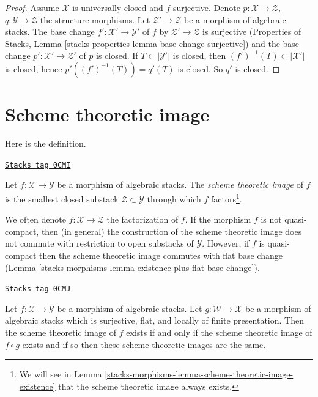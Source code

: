 \begin{proof}
Assume $\mathcal{X}$ is universally closed and $f$ surjective.
Denote $p : \mathcal{X} \to \mathcal{Z}$,
$q : \mathcal{Y} \to \mathcal{Z}$ the structure morphisms.
Let $\mathcal{Z}' \to \mathcal{Z}$ be a morphism of algebraic stacks.
The base change $f' : \mathcal{X}' \to \mathcal{Y}'$
of $f$ by $\mathcal{Z}' \to \mathcal{Z}$ is surjective
(Properties of Stacks, Lemma
\ref{stacks-properties-lemma-base-change-surjective}) and the base
change $p' : \mathcal{X}' \to \mathcal{Z}'$ of $p$ is closed.
If $T \subset |\mathcal{Y}'|$ is closed, then
$(f')^{-1}(T) \subset |\mathcal{X}'|$ is closed, hence
$p'((f')^{-1}(T)) = q'(T)$ is closed. So $q'$ is closed.
\end{proof}

\section{Scheme theoretic image}
\label{stacks-morphisms-section-scheme-theoretic-image}
Here is the definition.

\begin{definition}
\label{stacks-morphisms-definition-scheme-theoretic-image}
\href{https://stacks.math.columbia.edu/tag/0CMI}{\texttt{Stacks tag 0CMI}}

Let $f : \mathcal{X} \to \mathcal{Y}$ be a morphism of algebraic stacks.
The {\it scheme theoretic image} of $f$ is the smallest closed substack
$\mathcal{Z} \subset \mathcal{Y}$ through which $f$
factors\footnote{We will see in
Lemma \ref{stacks-morphisms-lemma-scheme-theoretic-image-existence}
that the scheme theoretic image always exists.}.
\end{definition}

We often denote $f : \mathcal{X} \to \mathcal{Z}$ the factorization of $f$.
If the morphism $f$ is not quasi-compact, then (in general) the
construction of the scheme theoretic image does not commute with
restriction to open substacks of $\mathcal{Y}$. However, if $f$ is
quasi-compact then the scheme theoretic image commutes with flat base change
(Lemma \ref{stacks-morphisms-lemma-existence-plus-flat-base-change}).

\begin{lemma}
\label{stacks-morphisms-lemma-cover-upstairs}
\href{https://stacks.math.columbia.edu/tag/0CMJ}{\texttt{Stacks tag 0CMJ}}

Let $f : \mathcal{X} \to \mathcal{Y}$ be a morphism of algebraic stacks.
Let $g : \mathcal{W} \to \mathcal{X}$ be a morphism of algebraic stacks
which is surjective, flat, and locally of finite presentation.
Then the scheme theoretic image of $f$ exists if and only if the
scheme theoretic image of $f \circ g$ exists and if so then these
scheme theoretic images are the same.
\end{lemma}

